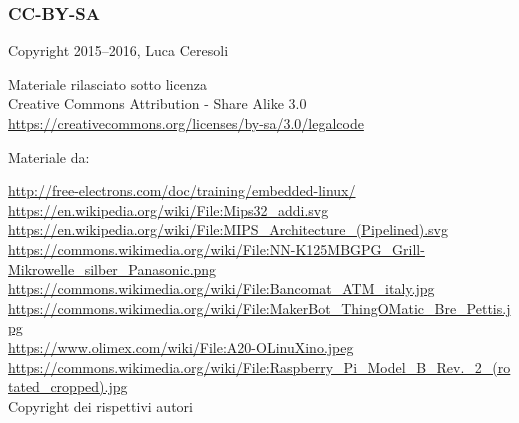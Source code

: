 \documentclass[xetex,table]{beamer}
\begin{document}
\begin{frame}
\frametitle{CC-BY-SA}
  \begin{center}
    \textcopyright{} Copyright 2015--2016, Luca Ceresoli\\

  \vspace{0.05\textheight}

   \small
   Materiale rilasciato sotto licenza\\
   Creative Commons Attribution - Share Alike 3.0 \\
   \url{https://creativecommons.org/licenses/by-sa/3.0/legalcode} \\
  \end{center}

  \vspace{0.05\textheight}

  Materiale da:

  \vspace{0.01\textheight}
  \begin{tiny}
    {
      \setlength{\parskip}{0cm plus0mm minus3mm}
      \fontsize{4}{0}
      \url{http://free-electrons.com/doc/training/embedded-linux/}\\
      \url{https://en.wikipedia.org/wiki/File:Mips32_addi.svg}\\
      \url{https://en.wikipedia.org/wiki/File:MIPS_Architecture_(Pipelined).svg}\\
      \url{https://commons.wikimedia.org/wiki/File:NN-K125MBGPG_Grill-Mikrowelle_silber_Panasonic.png}\\
      \url{https://commons.wikimedia.org/wiki/File:Bancomat_ATM_italy.jpg}\\
      \url{https://commons.wikimedia.org/wiki/File:MakerBot_ThingOMatic_Bre_Pettis.jpg}\\
      \url{https://www.olimex.com/wiki/File:A20-OLinuXino.jpeg}\\
      \url{https://commons.wikimedia.org/wiki/File:Raspberry_Pi_Model_B_Rev._2_(rotated_cropped).jpg}\\
      \textcopyright{} Copyright dei rispettivi autori
    }
  \end{tiny}
\end{frame}
\end{document}
